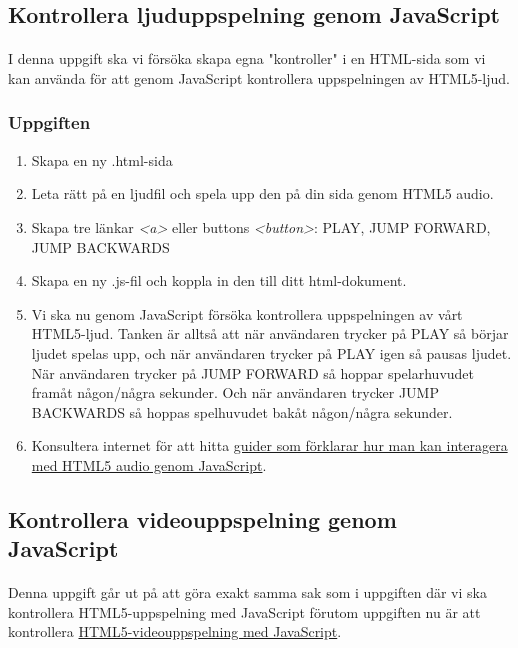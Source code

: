 \documentclass{article}
\begin{document}
  \subsection{ Kontrollera ljuduppspelning genom JavaScript }
    \paragraph{}
    I denna uppgift ska vi försöka skapa egna "kontroller" i en HTML-sida som vi kan använda för att genom JavaScript kontrollera uppspelningen av HTML5-ljud.

    \subsubsection*{Uppgiften}
      \begin{enumerate}
        \item Skapa en ny .html-sida
        \item Leta rätt på en ljudfil och spela upp den på din sida genom HTML5 audio.
        \item Skapa tre länkar \emph{<a>} eller buttons \emph{<button>}: PLAY, JUMP FORWARD, JUMP BACKWARDS
        \item Skapa en ny .js-fil och koppla in den till ditt html-dokument.
        \item Vi ska nu genom JavaScript försöka kontrollera uppspelningen av vårt HTML5-ljud. Tanken är alltså att när användaren trycker på PLAY så börjar ljudet spelas upp, och när användaren trycker på PLAY igen så pausas ljudet. När användaren trycker på JUMP FORWARD så hoppar spelarhuvudet framåt någon/några sekunder. Och när användaren trycker JUMP BACKWARDS så hoppas spelhuvudet bakåt någon/några sekunder.
        \item Konsultera internet för att hitta \href{http://msdn.microsoft.com/en-us/library/ie/hh924823(v=vs.85).aspx}{guider som förklarar hur man kan interagera med HTML5 audio genom JavaScript}.
      \end{enumerate}







  \subsection{ Kontrollera videouppspelning genom JavaScript }
    \paragraph{}
    Denna uppgift går ut på att göra exakt samma sak som i uppgiften där vi ska kontrollera HTML5-uppspelning med JavaScript förutom uppgiften nu är att kontrollera \href{http://msdn.microsoft.com/en-us/library/ie/hh924823(v=vs.85).aspx}{HTML5-videouppspelning med JavaScript}.
\end{document}
